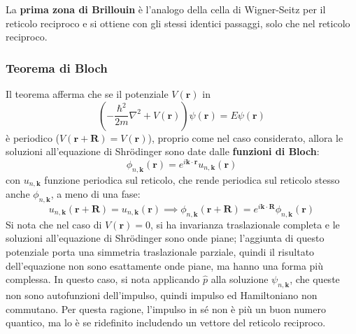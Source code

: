 \documentclass[10pt, a4paper]{scrartcl}
\numberwithin{equation}{subsection}
\theoremstyle{style1}
\theoremstyle{style2}
\begin{document}
La \textbf{prima zona di Brillouin} \`e l'analogo della cella di Wigner-Seitz per il reticolo reciproco e si ottiene con gli stessi identici passaggi, solo che nel reticolo reciproco.
 
\subsubsection{Teorema di Bloch}
Il teorema afferma che se il potenziale $V(\mathbf{r} )$ in
\[
\left( - \frac{\hbar ^2}{2m}\nabla ^2 + V(\mathbf{r} )\right) \psi (\mathbf{r} ) = E \psi (\mathbf{r} )
\] 
\`e periodico ($V(\mathbf{r} +\mathbf{R} )=V(\mathbf{r} )$), proprio come nel caso considerato, allora le soluzioni all'equazione di Shr\"odinger sono date dalle \textbf{funzioni di Bloch}:
\begin{equation}
	\phi _{n, \mathbf{k} } (\mathbf{r} ) = e^{i \mathbf{k} \cdot \mathbf{r} } u _{n, \mathbf{k} } (\mathbf{r} )
\end{equation}
con $u_{n, \mathbf{k} } $ funzione periodica sul reticolo, che rende periodica sul reticolo stesso anche  $\phi _{n,\mathbf{k} } $, a meno di una fase:
\[
u_{n,\mathbf{k} } (\mathbf{r} + \mathbf{R} ) = u_{n,\mathbf{k} } (\mathbf{r} ) \implies \phi _{n,\mathbf{k} } (\mathbf{r} + \mathbf{R} ) = e^{i \mathbf{k} \cdot \mathbf{R} } \phi _{n,\mathbf{k} } (\mathbf{r} ) 
\] 
Si nota che nel caso di $V(\mathbf{r}) =0$, si ha invarianza traslazionale completa e le soluzioni all'equazione di Shr\"odinger sono onde piane; l'aggiunta di questo potenziale porta una simmetria traslazionale parziale, quindi il risultato dell'equazione non sono esattamente onde piane, ma hanno una forma pi\`u complessa. 
In questo caso, si nota applicando $\hat{p}$ alla soluzione $\psi _{n,\mathbf{k} } $, che queste non sono autofunzioni dell'impulso, quindi impulso ed Hamiltoniano non commutano.
Per questa ragione, l'impulso in s\'e non \`e pi\`u un buon numero quantico, ma lo \`e se ridefinito includendo un vettore del reticolo reciproco.
\end{document}
